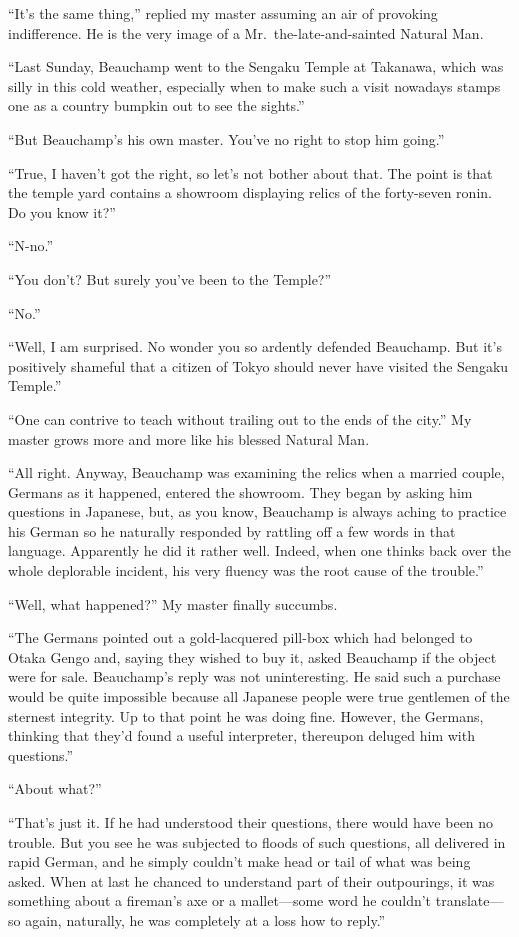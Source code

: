 \documentclass{book}
\begin{document}
``It's the same thing,'' replied my master assuming an air of provoking
indifference. He is the very image of a Mr.~the-late-and-sainted Natural
Man.

``Last Sunday, Beauchamp went to the Sengaku Temple at Takanawa, which
was silly in this cold weather, especially when to make such a visit
nowadays stamps one as a country bumpkin out to see the sights.''

``But Beauchamp's his own master. You've no right to stop him going.''

``True, I haven't got the right, so let's not bother about that. The
point is that the temple yard contains a showroom displaying relics of
the forty-seven ronin. Do you know it?''

``N-no.''

``You don't? But surely you've been to the Temple?''

``No.''

``Well, I am surprised. No wonder you so ardently defended Beauchamp.
But it's positively shameful that a citizen of Tokyo should never have
visited the Sengaku Temple.''

``One can contrive to teach without trailing out to the ends of the
city.'' My master grows more and more like his blessed Natural Man.

``All right. Anyway, Beauchamp was examining the relics when a married
couple, Germans as it happened, entered the showroom. They began by
asking him questions in Japanese, but, as you know, Beauchamp is always
aching to practice his German so he naturally responded by rattling off
a few words in that language. Apparently he did it rather well. Indeed,
when one thinks back over the whole deplorable incident, his very
fluency was the root cause of the trouble.''

``Well, what happened?'' My master finally succumbs.

``The Germans pointed out a gold-lacquered pill-box which had belonged
to Otaka Gengo and, saying they wished to buy it, asked Beauchamp if the
object were for sale. Beauchamp's reply was not uninteresting. He said
such a purchase would be quite impossible because all Japanese people
were true gentlemen of the sternest integrity. Up to that point he was
doing fine. However, the Germans, thinking that they'd found a useful
interpreter, thereupon deluged him with questions.''

``About what?''

``That's just it. If he had understood their questions, there would have
been no trouble. But you see he was subjected to floods of such
questions, all delivered in rapid German, and he simply couldn't make
head or tail of what was being asked. When at last he chanced to
understand part of their outpourings, it was something about a fireman's
axe or a mallet---some word he couldn't translate---so again, naturally,
he was completely at a loss how to reply.''
\end{document}
